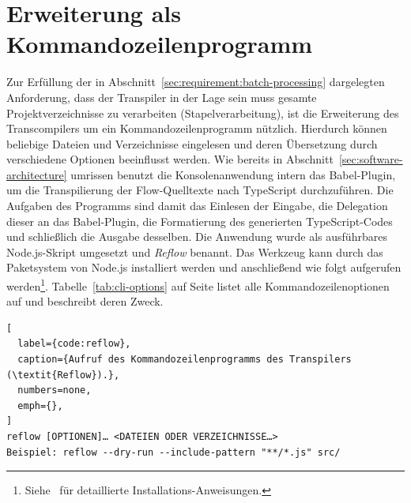 \section{Erweiterung als Kommandozeilenprogramm}
\label{sec:cli-program}

Zur Erfüllung der in Abschnitt~\ref{sec:requirement:batch-processing} dargelegten Anforderung, dass der Transpiler in der Lage sein muss gesamte Projektverzeichnisse zu verarbeiten (Stapelverarbeitung), ist die Erweiterung des Transcompilers um ein Kommandozeilenprogramm nützlich. Hierdurch können beliebige Dateien und Verzeichnisse eingelesen und deren Übersetzung durch verschiedene Optionen beeinflusst werden. Wie bereits in Abschnitt~\ref{sec:software-architecture} umrissen benutzt die Konsolenanwendung intern das Babel-Plugin, um die Transpilierung der Flow-Quelltexte nach TypeScript durchzuführen. Die Aufgaben des Programms sind damit das Einlesen der Eingabe, die Delegation dieser an das Babel-Plugin, die Formatierung des generierten TypeScript-Codes und schließlich die Ausgabe desselben.
Die Anwendung wurde als ausführbares Node.js-Skript umgesetzt und \textit{Reflow} benannt. Das Werkzeug kann durch das Paketsystem von Node.js installiert werden und anschließend wie folgt aufgerufen werden\footnote{Siehe~\autocite{REFLOW_GITHUB} für detaillierte Installations-Anweisungen.}. Tabelle~\ref{tab:cli-options} auf Seite \pageref{tab:cli-options} listet alle Kommandozeilenoptionen auf und beschreibt deren Zweck.

\begin{lstlisting}[
  label={code:reflow},
  caption={Aufruf des Kommandozeilenprogramms des Transpilers (\textit{Reflow}).},
  numbers=none,
  emph={},
]
reflow [OPTIONEN]… <DATEIEN ODER VERZEICHNISSE…>
Beispiel: reflow --dry-run --include-pattern "**/*.js" src/
\end{lstlisting}

\medbreak


